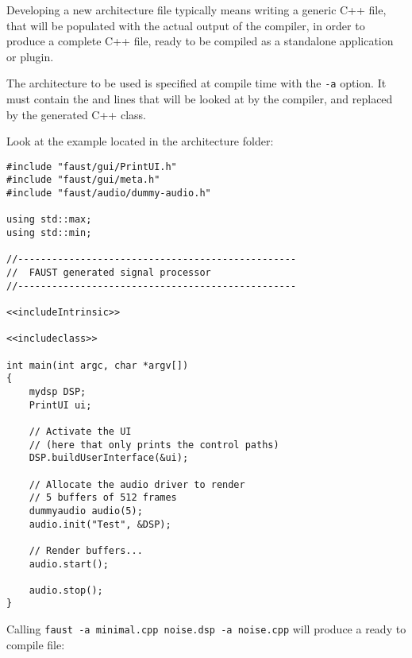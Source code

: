 Developing a new architecture file typically means writing a generic C++ file, that will be populated with the actual output of the \faust compiler, in order to produce a complete C++ file, ready to be compiled as a standalone application or plugin. 

The architecture to be used is specified at compile time with the \lstinline'-a' option. It must contain the  and  lines that will be looked at by the \faust compiler, and replaced by the generated C++ class. 

Look at the  example located in the architecture folder:

\begin{lstlisting}[basicstyle=\ttfamily\footnotesize\color{yotxt}]
#include "faust/gui/PrintUI.h"
#include "faust/gui/meta.h"
#include "faust/audio/dummy-audio.h"

using std::max;
using std::min;

//-------------------------------------------------
//  FAUST generated signal processor
//-------------------------------------------------

<<includeIntrinsic>>

<<includeclass>>

int main(int argc, char *argv[])
{
    mydsp DSP;
    PrintUI ui;
    
    // Activate the UI
    // (here that only prints the control paths)
    DSP.buildUserInterface(&ui);

    // Allocate the audio driver to render 
    // 5 buffers of 512 frames
    dummyaudio audio(5);
    audio.init("Test", &DSP);
    
    // Render buffers...
    audio.start();
    
    audio.stop();
}
\end{lstlisting} 

Calling \lstinline'faust -a minimal.cpp noise.dsp -a noise.cpp' will produce a ready to compile   file:

